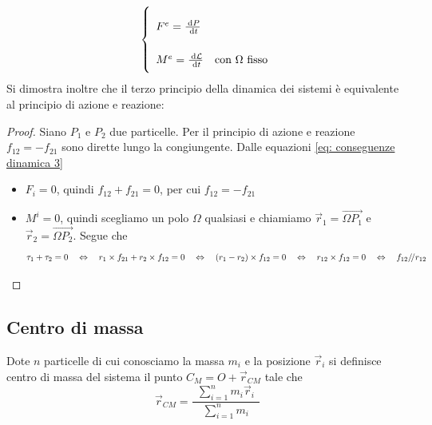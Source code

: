 \documentclass{article}
\theoremstyle{plain}
\begin{document}
\begin{equation}
    \renewcommand{\arraystretch}{2.5}
    \left\{\begin{array}{ll} 
        F^e =\frac{\d P}{\d t}\\
        M^e = \frac{\d \mathcal{L}}{\d t} & \text{con $\Omega$ fisso}
     \end{array} \right.
     \label{eq: cardinali}
\end{equation}
Si dimostra inoltre che il terzo principio della dinamica dei sistemi è equivalente al principio di azione e reazione:
\begin{proof}
    Siano $P_1$ e $P_2$ due particelle. Per il principio di azione e reazione $f_{12}=-f_{21}$ sono dirette lungo la congiungente. Dalle equazioni \eqref{eq: conseguenze dinamica 3} \begin{itemize}
        \item $F_i=0$, quindi $f_{12}+f_{21}=0$, per cui $f_{12}=-f_{21}$
        \item $M^i=0$, quindi scegliamo un polo $\Omega$ qualsiasi e chiamiamo $\vec r_1 = \overrightarrow{\Omega P_1}$ e $\vec r_2 = \overrightarrow{\Omega P_2}$. Segue che
        \[\tau_1 +\tau_2 = 0\quad\Leftrightarrow\quad  r_1 \times f_{21} + r_2 \times f_{12} = 0\quad \Leftrightarrow\quad (r_1 - r_2) \times f_{12} = 0\quad \Leftrightarrow\quad r_{12} \times f_{12} = 0 \quad \Leftrightarrow\quad f_{12}{/\!/} r_{12}\]
    \end{itemize}
\end{proof}
\subsection{Centro di massa}
\begin{boxdef}
    Dote $n$ particelle di cui conosciamo la massa $m_i$ e la posizione $\vec r_i$ si definisce centro di massa del sistema il punto $C_M=O+\vec r_{CM}$ tale che 
    \[\vec r_{CM} =\frac{~~\sum\limits_{i = 1}^nm_i\vec r_i~~}{\sum\limits_{i = 1}^nm_i}\]
\end{boxdef}
\end{document}
